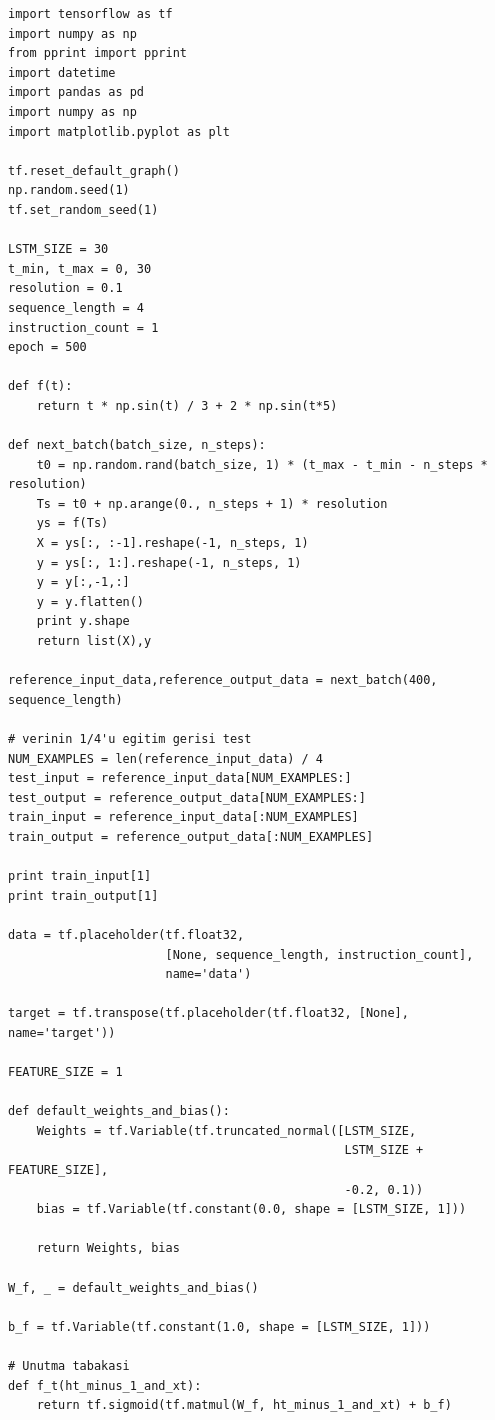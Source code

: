 \documentclass[12pt,fleqn]{article}\usepackage{../../common}
\begin{document}
\begin{verbatim}
import tensorflow as tf
import numpy as np
from pprint import pprint
import datetime
import pandas as pd
import numpy as np
import matplotlib.pyplot as plt

tf.reset_default_graph()
np.random.seed(1)
tf.set_random_seed(1)

LSTM_SIZE = 30
t_min, t_max = 0, 30
resolution = 0.1
sequence_length = 4
instruction_count = 1
epoch = 500

def f(t):
    return t * np.sin(t) / 3 + 2 * np.sin(t*5)

def next_batch(batch_size, n_steps):
    t0 = np.random.rand(batch_size, 1) * (t_max - t_min - n_steps * resolution)
    Ts = t0 + np.arange(0., n_steps + 1) * resolution
    ys = f(Ts)
    X = ys[:, :-1].reshape(-1, n_steps, 1)
    y = ys[:, 1:].reshape(-1, n_steps, 1)
    y = y[:,-1,:]
    y = y.flatten()
    print y.shape    
    return list(X),y

reference_input_data,reference_output_data = next_batch(400, sequence_length)
   
# verinin 1/4'u egitim gerisi test
NUM_EXAMPLES = len(reference_input_data) / 4 
test_input = reference_input_data[NUM_EXAMPLES:]
test_output = reference_output_data[NUM_EXAMPLES:] 
train_input = reference_input_data[:NUM_EXAMPLES]
train_output = reference_output_data[:NUM_EXAMPLES]

print train_input[1]
print train_output[1]

data = tf.placeholder(tf.float32, 
                      [None, sequence_length, instruction_count], 
                      name='data')

target = tf.transpose(tf.placeholder(tf.float32, [None], name='target'))

FEATURE_SIZE = 1 

def default_weights_and_bias():
    Weights = tf.Variable(tf.truncated_normal([LSTM_SIZE, 
                                               LSTM_SIZE + FEATURE_SIZE], 
                                               -0.2, 0.1))
    bias = tf.Variable(tf.constant(0.0, shape = [LSTM_SIZE, 1]))
    
    return Weights, bias

W_f, _ = default_weights_and_bias()

b_f = tf.Variable(tf.constant(1.0, shape = [LSTM_SIZE, 1]))

# Unutma tabakasi
def f_t(ht_minus_1_and_xt):
    return tf.sigmoid(tf.matmul(W_f, ht_minus_1_and_xt) + b_f)


\end{verbatim}
\end{document}
